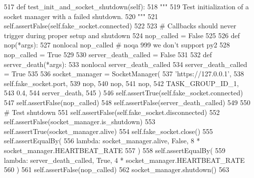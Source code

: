 \begin{DoxyCode}
517     \textcolor{keyword}{def }test\_init\_and\_socket\_shutdown(self):
518         \textcolor{stringliteral}{"""}
519 \textcolor{stringliteral}{        Test initialization of a socket manager with a failed shutdown.}
520 \textcolor{stringliteral}{        """}
521         self.assertFalse(self.fake\_socket.connected)
522 
523         \textcolor{comment}{# Callbacks should never trigger during proper setup and shutdown}
524         nop\_called = \textcolor{keyword}{False}
525 
526         \textcolor{keyword}{def }nop(*args):
527             nonlocal nop\_called  \textcolor{comment}{# noqa 999 we don't support py2}
528             nop\_called = \textcolor{keyword}{True}
529 
530         server\_death\_called = \textcolor{keyword}{False}
531 
532         \textcolor{keyword}{def }server\_death(*args):
533             nonlocal server\_death\_called
534             server\_death\_called = \textcolor{keyword}{True}
535 
536         socket\_manager = SocketManager(
537             \textcolor{stringliteral}{'https://127.0.0.1'},
538             self.fake\_socket.port,
539             nop,
540             nop,
541             nop,
542             TASK\_GROUP\_ID\_1,
543             0.4,
544             server\_death,
545         )
546         self.assertTrue(self.fake\_socket.connected)
547         self.assertFalse(nop\_called)
548         self.assertFalse(server\_death\_called)
549 
550         \textcolor{comment}{# Test shutdown}
551         self.assertFalse(self.fake\_socket.disconnected)
552         self.assertFalse(socket\_manager.is\_shutdown)
553         self.assertTrue(socket\_manager.alive)
554         self.fake\_socket.close()
555         self.assertEqualBy(
556             \textcolor{keyword}{lambda}: socket\_manager.alive, \textcolor{keyword}{False}, 8 * socket\_manager.HEARTBEAT\_RATE
557         )
558         self.assertEqualBy(
559             \textcolor{keyword}{lambda}: server\_death\_called, \textcolor{keyword}{True}, 4 * socket\_manager.HEARTBEAT\_RATE
560         )
561         self.assertFalse(nop\_called)
562         socket\_manager.shutdown()
563 
\end{DoxyCode}
\mbox{\label{classparlai_1_1mturk_1_1core_1_1test_1_1test__socket__manager_1_1TestSocketManagerSetupAndFunctions_a0f825d0f19915160c055aa62f1c1e34f}} 
